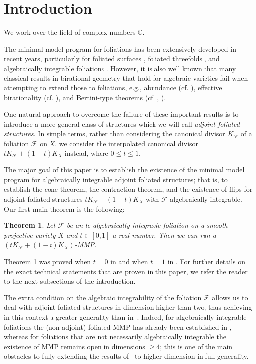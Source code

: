 \documentclass[12pt]{amsart}
\numberwithin{equation}{section}
\newcommand{\Ff}{\mathcal{F}}
\newtheorem{thm}{Theorem}[section]
\theoremstyle{definition}
\theoremstyle{definition}
\theoremstyle{definition}
\begin{document}
\tableofcontents


\section{Introduction}\label{sec:Introduction}
We work over the field of complex numbers $\mathbb{C}$.

The minimal model program for foliations has been extensively developed in recent years, particularly for foliated surfaces \cite{McQ08,Bru15}, foliated threefolds \cite{CS20,Spi20,CS21,SS22}, and algebraically integrable foliations \cite{ACSS21,CS23a,CHLX23,LMX24b}. However, it is also well known that many classical results in birational geometry that hold for algebraic varieties fail when attempting to extend those to foliations, e.g., abundance (cf. \cite[Theorem 3 IV.5.11]{McQ08}), effective birationality (cf. \cite[Theorem 1.3]{Lü24}), and Bertini-type theorems (cf. \cite[Example 3.4]{DLM23}, \cite[3.5.2]{CS23b}).

One natural approach to overcome the failure of these important results is to introduce a more general class of structures which we will call 
\emph{adjoint foliated structures}. 
In simple terms,  rather than  considering the canonical divisor $K_{\Ff}$ of a foliation $\Ff$ on $X$, 
we consider the interpolated canonical divisor
$tK_{\Ff}+(1-t)K_X$ instead, where $0\leq t\leq 1$.

The major goal of this paper is to establish the existence of the minimal model program for algebraically integrable adjoint foliated structures; that is, to establish the cone theorem, the contraction theorem, and the existence of flips for adjoint foliated structures $tK_{\Ff}+(1-t)K_X$ with $\Ff$ algebraically integrable. Our first main theorem is the following:

\begin{thm}\label{thm: simplified main theorem}
Let $\Ff$ be an lc algebraically integrable foliation on a smooth projective variety $X$ and $t\in [0,1]$ a real number. Then we can run a $(tK_{\Ff}+(1-t)K_X)$-MMP.
\end{thm}


Theorem \ref{thm: simplified main theorem} was proved when $t=0$ in \cite{BCHM10} and when $t=1$ in \cite{LMX24b}. For further details on the exact technical statements that are proven in this paper, we refer the reader to the next subsections of the introduction.


The extra condition on the algebraic integrability of the foliation $\mathcal F$ allows us to deal with adjoint foliated structures in dimension higher than two, thus achieving in this context a greater generality than in~\cite{SS23}. 
Indeed, for algebraically integrable foliations the (non-adjoint) foliated MMP has already been established in \cite{ACSS21,CS23a,CHLX23,LMX24b}, whereas for foliations that are not necessarily  algebraically integrable the existence of MMP remains open in dimensions $\geq 4$;
this is one of the main obstacles to fully extending the results of~\cite{SS23} to higher dimension in full generality.
\end{document}

